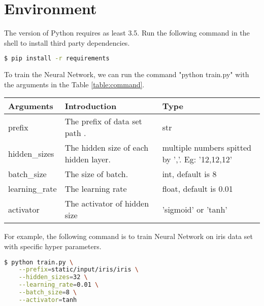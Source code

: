 \section{Environment}
\vspace*{-.05in}

The version of Python requires as least 3.5. Run the following command in the shell to install third party dependencies.
\begin{lstlisting}[language=bash]
$ pip install -r requirements
\end{lstlisting}

To train the Neural Network, we can run the command "python train.py" with the arguments in the Table \ref{table:command}.
\begin{table*}[hbt]
	\caption{The arguments for train.py}
	\label{table:command}
	
	\centering
	\begin{tabular}{l|l|l}		
		Arguments		&Introduction								&Type \\ \hline
		prefix	 		&The prefix of data set path	.				&str	 \\
		hidden\_sizes 	&The hidden size of each hidden layer.		&multiple numbers spitted by ','. Eg: '12,12,12' \\
		batch\_size	 	&The size of batch.							&int, default is 8 \\
		learning\_rate	&The learning rate							&float, default is 0.01 \\
		activator		&The activator of hidden size				&'sigmoid' or 'tanh'
	\end{tabular}
\end{table*}
For example, the following command is to train Neural Network on iris data set with specific hyper parameters.
\begin{lstlisting}[language=bash]
$ python train.py \
    --prefix=static/input/iris/iris \
    --hidden_sizes=32 \
    --learning_rate=0.01 \
    --batch_size=8 \
    --activator=tanh                 
\end{lstlisting}

